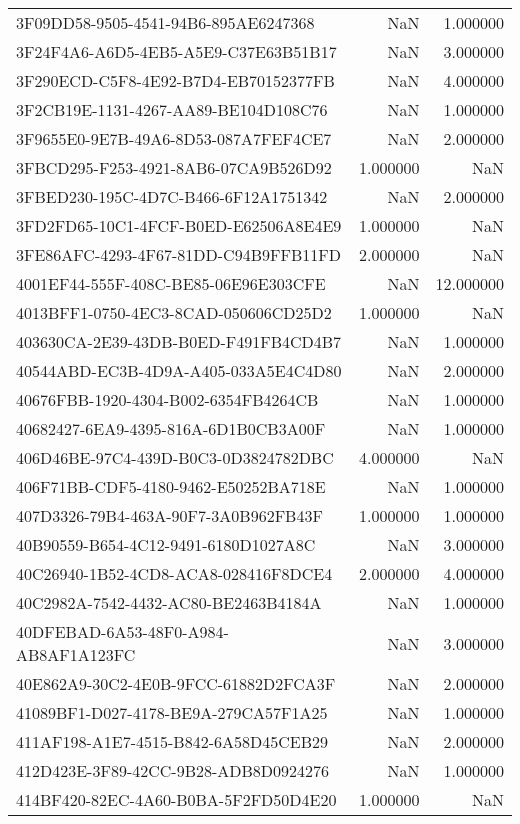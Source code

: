 \begin{tabular}{lrr}
3F09DD58-9505-4541-94B6-895AE6247368 & NaN & 1.000000 \\
3F24F4A6-A6D5-4EB5-A5E9-C37E63B51B17 & NaN & 3.000000 \\
3F290ECD-C5F8-4E92-B7D4-EB70152377FB & NaN & 4.000000 \\
3F2CB19E-1131-4267-AA89-BE104D108C76 & NaN & 1.000000 \\
3F9655E0-9E7B-49A6-8D53-087A7FEF4CE7 & NaN & 2.000000 \\
3FBCD295-F253-4921-8AB6-07CA9B526D92 & 1.000000 & NaN \\
3FBED230-195C-4D7C-B466-6F12A1751342 & NaN & 2.000000 \\
3FD2FD65-10C1-4FCF-B0ED-E62506A8E4E9 & 1.000000 & NaN \\
3FE86AFC-4293-4F67-81DD-C94B9FFB11FD & 2.000000 & NaN \\
4001EF44-555F-408C-BE85-06E96E303CFE & NaN & 12.000000 \\
4013BFF1-0750-4EC3-8CAD-050606CD25D2 & 1.000000 & NaN \\
403630CA-2E39-43DB-B0ED-F491FB4CD4B7 & NaN & 1.000000 \\
40544ABD-EC3B-4D9A-A405-033A5E4C4D80 & NaN & 2.000000 \\
40676FBB-1920-4304-B002-6354FB4264CB & NaN & 1.000000 \\
40682427-6EA9-4395-816A-6D1B0CB3A00F & NaN & 1.000000 \\
406D46BE-97C4-439D-B0C3-0D3824782DBC & 4.000000 & NaN \\
406F71BB-CDF5-4180-9462-E50252BA718E & NaN & 1.000000 \\
407D3326-79B4-463A-90F7-3A0B962FB43F & 1.000000 & 1.000000 \\
40B90559-B654-4C12-9491-6180D1027A8C & NaN & 3.000000 \\
40C26940-1B52-4CD8-ACA8-028416F8DCE4 & 2.000000 & 4.000000 \\
40C2982A-7542-4432-AC80-BE2463B4184A & NaN & 1.000000 \\
40DFEBAD-6A53-48F0-A984-AB8AF1A123FC & NaN & 3.000000 \\
40E862A9-30C2-4E0B-9FCC-61882D2FCA3F & NaN & 2.000000 \\
41089BF1-D027-4178-BE9A-279CA57F1A25 & NaN & 1.000000 \\
411AF198-A1E7-4515-B842-6A58D45CEB29 & NaN & 2.000000 \\
412D423E-3F89-42CC-9B28-ADB8D0924276 & NaN & 1.000000 \\
414BF420-82EC-4A60-B0BA-5F2FD50D4E20 & 1.000000 & NaN \\

\end{tabular}
